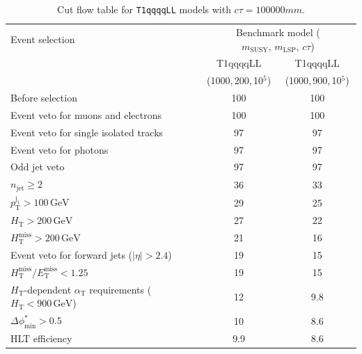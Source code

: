 \begin{table}[!h]
  \caption{Cut flow table for \texttt{T1qqqqLL} models with $c\tau = 100000\unit{mm}$.} 
  \label{tab:cut_flow_ctau_100000}
{\scriptsize%
\centering
\begin{tabular}{lcc}
  \hline
  Event selection & \multicolumn{2}{c}{Benchmark model ($m_\mathrm{SUSY},\,m_\mathrm{LSP},\,c\tau$)} \\
  \cline{2-3}
   & T1qqqqLL & T1qqqqLL \\
    & (1000,\,200,\,10$^5$) & (1000,\,900,\,10$^5$) \\
  \hline
  Before selection  & 100\phantom{.1} & 100\phantom{.1} \\
  Event veto for muons and electrons & 100\phantom{.1} & 100\phantom{.1} \\
  Event veto for single isolated tracks & \phantom{1}97\phantom{.1} & \phantom{1}97\phantom{.1} \\
  Event veto for photons & \phantom{1}97\phantom{.1} & \phantom{1}97\phantom{.1} \\
  Odd jet veto & \phantom{1}97\phantom{.1} & \phantom{1}97\phantom{.1} \\
   $n_{\mathrm{jet}} \geq 2$  & \phantom{1}36\phantom{.1} & \phantom{1}33\phantom{.1} \\
   $p_{\mathrm{T}}^{\mathrm{j_1}} > 100\,\mathrm{GeV}$ & \phantom{1}29\phantom{.1} & \phantom{1}25\phantom{.1} \\
   $H_{\mathrm{T}} > 200\,\mathrm{GeV}$  & \phantom{1}27\phantom{.1} & \phantom{1}22\phantom{.1} \\
  $H_{\mathrm{T}}^{\mathrm{miss}} > 200\,\mathrm{GeV}$  & \phantom{1}21\phantom{.1} & \phantom{1}16\phantom{.1} \\
  Event veto for forward jets ($|\eta| > 2.4$) & \phantom{1}19\phantom{.1} & \phantom{1}15\phantom{.1} \\
  $H_{\mathrm{T}}^{\mathrm{miss}} / E_{\mathrm{T}}^{\mathrm{miss}} < 1.25$ & \phantom{1}19\phantom{.1} & \phantom{1}15\phantom{.1} \\
  $H_{\mathrm{T}}$-dependent $\alpha_{\mathrm{T}}$ requirements ($H_{\mathrm{T}} < 900\,\mathrm{GeV}$)  &  \phantom{1}12 \phantom{.1} & \phantom{10}9.8 \\
  $\Delta\phi^{*}_{\mathrm{min}} > 0.5$  &  \phantom{1}10 \phantom{.1} & \phantom{10}8.6 \\
  \hline
  HLT efficiency &  \phantom{10}9.9 &  \phantom{10}8.6 \\
  \hline
\end{tabular}
}
\end{table}


